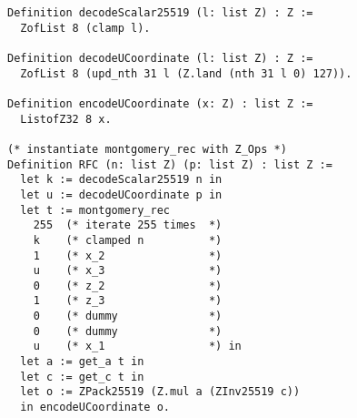 \begin{lstlisting}[language=Coq]
Definition decodeScalar25519 (l: list Z) : Z :=
  ZofList 8 (clamp l).

Definition decodeUCoordinate (l: list Z) : Z :=
  ZofList 8 (upd_nth 31 l (Z.land (nth 31 l 0) 127)).

Definition encodeUCoordinate (x: Z) : list Z :=
  ListofZ32 8 x.

(* instantiate montgomery_rec with Z_Ops *)
Definition RFC (n: list Z) (p: list Z) : list Z :=
  let k := decodeScalar25519 n in
  let u := decodeUCoordinate p in
  let t := montgomery_rec
    255  (* iterate 255 times  *)
    k    (* clamped n          *)
    1    (* x_2                *)
    u    (* x_3                *)
    0    (* z_2                *)
    1    (* z_3                *)
    0    (* dummy              *)
    0    (* dummy              *)
    u    (* x_1                *) in
  let a := get_a t in
  let c := get_c t in
  let o := ZPack25519 (Z.mul a (ZInv25519 c))
  in encodeUCoordinate o.
\end{lstlisting}


%
%
%
%
